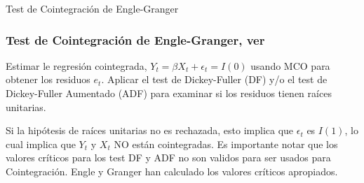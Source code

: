 \documentclass[spanish,xcolor=table]{beamer}
\begin{document}
\begin{section}{Test de Cointegraci\'on de Engle-Granger}
\begin{frame}
\frametitle{Test de Cointegraci\'on de Engle-Granger, ver \cite{engle1987co}}

Estimar le regresi\'on cointegrada, $Y_t = \beta X_t + \epsilon_t = I(0)$ usando MCO para obtener los residuos $e_t$. Aplicar el test de Dickey-Fuller (DF) y/o el test de Dickey-Fuller Aumentado (ADF) para examinar si los residuos tienen ra\'{i}ces unitarias. \\

\vspace{4mm}	

Si la hip\'otesis de ra\'{i}ces unitarias no es rechazada, esto implica que $\epsilon_t$ es $I(1)$, lo cual implica que $Y_t$ y $X_t$ NO est\'an cointegradas. Es importante notar que los valores cr\'{i}ticos para los test DF y ADF no son validos para ser usados para Cointegraci\'on. Engle y Granger han calculado los valores cr\'{i}ticos apropiados.

\end{frame}
\end{section}
\end{document}
